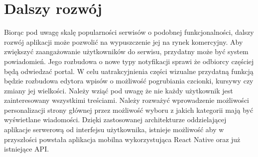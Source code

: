 \documentclass[declaration,shortabstract]{iithesis}
\begin{document}
\section{Dalszy rozwój}

Biorąc pod uwagę skalę popularności serwisów o podobnej funkcjonalności, dalszy rozwój aplikacji może pozwolić na wypuszczenie jej na rynek komercyjny. Aby zwiększyć zaangażowanie użytkowników do serwisu, przydatny może być system powiadomień. Jego rozbudowa o nowe typy notyfikacji sprawi że odbiorcy częściej będą odwiedzać portal. W celu uatrakcyjnienia części wizualne przydatną funkcją będzie rozbudowa edytora wpisów o możliwość pogrubiania czcionki, kursywy czy zmiany jej wielkości. Należy wziąć pod uwagę że nie każdy użytkownik jest zainteresowany wszystkimi treściami. Należy rozważyć wprowadzenie możliwości personalizacji strony głównej przez możliwość wyboru z jakich kategorii mają być wyświetlane wiadomości. Dzięki zastosowanej architekturze oddzielającej aplikacje serwerową od interfejsu użytkownika, istnieje możliwość aby w przyszłości powstała aplikacja mobilna wykorzystująca React Native oraz już istniejące API.



\end{document}
